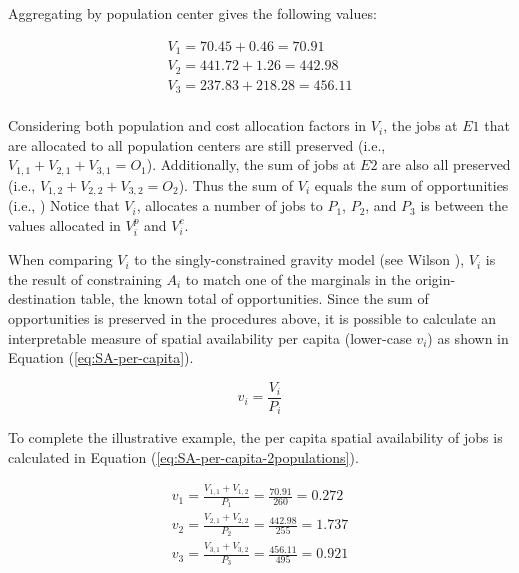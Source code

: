 \documentclass[]{elsarticle} %
\begin{document}
Aggregating by population center gives the following values:

\begin{equation}
\label{eq:SA-2populations-2}
\begin{array}{l}
V_{1} = 70.45 + 0.46 = 70.91\\
V_{2} = 441.72 + 1.26 = 442.98\\
V_{3} = 237.83 + 218.28 = 456.11\\
\end{array}
\end{equation}

Considering both population and cost allocation factors in \(V_{i}\),
the jobs at \(E1\) that are allocated to all population centers are
still preserved (i.e., \(V_{1,1} + V_{2,1} + V_{3,1} = O_1\)).
Additionally, the sum of jobs at \(E2\) are also all preserved (i.e.,
\(V_{1,2} + V_{2,2} + V_{3,2} = O_2\)). Thus the sum of \(V_{i}\) equals
the sum of opportunities (i.e., ) Notice that \(V_{i}\), allocates a
number of jobs to \(P_1\), \(P_2\), and \(P_3\) is between the values
allocated in \(V^p_{i}\) and \(V^c_{i}\).

When comparing \(V_i\) to the singly-constrained gravity model (see
Wilson \citeyearpar{wilson1971}), \(V_i\) is the result of constraining
\(A_i\) to match one of the marginals in the origin-destination table,
the known total of opportunities. Since the sum of opportunities is
preserved in the procedures above, it is possible to calculate an
interpretable measure of spatial availability per capita (lower-case
\(v_i\)) as shown in Equation (\ref{eq:SA-per-capita}).

\begin{equation}
\label{eq:SA-per-capita}
v_i = \frac{V_i}{P_i}
\end{equation}

To complete the illustrative example, the per capita spatial
availability of jobs is calculated in Equation
(\ref{eq:SA-per-capita-2populations}).

\begin{equation}
\label{eq:SA-per-capita-2populations}
\begin{array}{l}
v_{1} = \frac{V_{1,1} + V_{1,2}}{P_1} =  \frac{70.91}{260} = 0.272\\
v_{2} =  \frac{V_{2,1} + V_{2,2}}{P_2} =  \frac{442.98}{255} = 1.737\\
v_{3} =  \frac{V_{3,1} + V_{3,2}}{P_3} =  \frac{456.11}{495} = 0.921\\
\end{array}
\end{equation}
\end{document}

